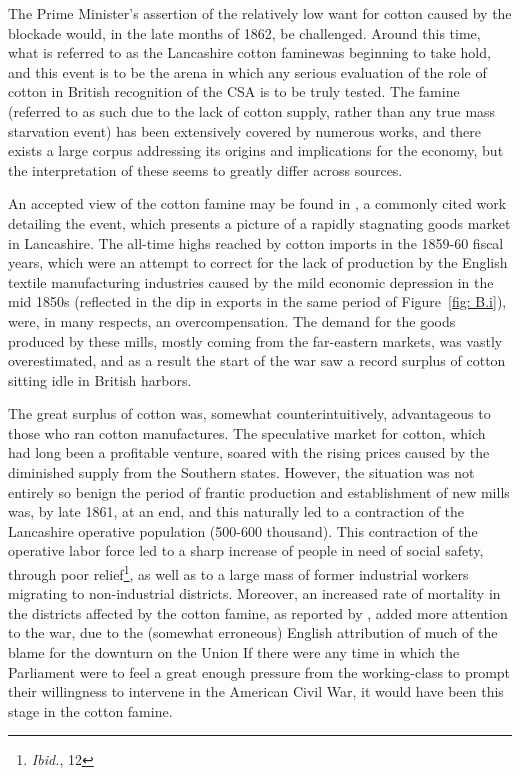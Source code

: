 \hfill

The Prime Minister's assertion of the relatively low want for cotton caused by the blockade would, in the late months of 1862, be challenged. Around this time,
what is referred to as the \flq Lancashire cotton famine\frq was beginning to take hold, and this event is to be the arena in which any serious evaluation
of the role of cotton in British recognition of the CSA is to be truly tested. The famine (referred to as such due to the lack of cotton supply, rather than 
any true mass starvation event) has been extensively covered by numerous works, and there exists a large corpus addressing its origins and 
implications for the economy, but the interpretation of these seems to greatly differ across sources. 

An accepted view of the cotton famine may be found in , a commonly cited work detailing the event, which 
presents a picture of a rapidly stagnating goods market in Lancashire\autocite[78]{arnoldHistoryCotton1864}. The all-time highs reached by cotton imports 
in the 1859-60 fiscal years, which were an attempt to correct for the lack of production by the English textile manufacturing industries caused by the 
mild economic depression in the mid 1850s (reflected in the dip in exports in the same period of Figure~\ref{fig: B.i}), were, in many respects, an 
overcompensation. The demand for the goods produced by these mills, mostly coming from the far-eastern markets, was vastly overestimated, and as a result 
the start of the war saw a record surplus of cotton sitting idle in British harbors. 

The great surplus of cotton was, somewhat counterintuitively, advantageous to those who ran cotton manufactures. The speculative market for cotton,
which had long been a profitable venture, soared with the rising prices caused by the diminished supply from the Southern states. However, the situation
was not entirely so benign \textemdash the period of frantic production and establishment of new mills was, by late 1861, at an end, and this naturally led to
a contraction of the Lancashire operative population (500-600 thousand\Autocite*[Vol.II, p.13]{adamsBritainAmericanWar1925}). This contraction of the 
operative labor force led to a sharp increase of people in need of social safety, through \flq poor relief\frq\footnote{\textit{Ibid.}, 12},
as well as to a large mass of former industrial workers migrating to non-industrial districts\autocite{arthi2022recessions}. Moreover, an increased rate of
mortality in the districts affected by the cotton famine, as reported by , added more attention to the war, due to the 
(somewhat erroneous) English attribution of much of the blame for the downturn on the Union\autocite[229]{arnoldHistoryCotton1864} \textemdash
If there were any time in which the Parliament were to feel a great enough pressure from the working-class to prompt their willingness to intervene in the
American Civil War, it would have been this stage in the cotton famine.

